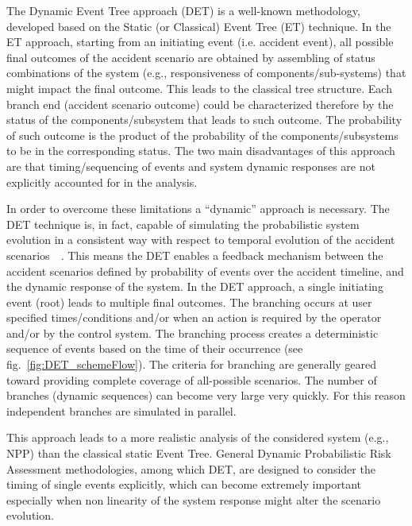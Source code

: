 \label{sec:det}
The Dynamic Event Tree approach (DET) is a well-known methodology, developed based on the Static (or Classical) Event Tree (ET) technique. In the ET approach, starting from an initiating event (i.e. accident event), all possible final outcomes of the accident scenario are obtained by assembling of status combinations of the system (e.g., responsiveness of components/sub-systems) that might impact the final outcome. This leads to the classical tree structure. Each branch end (accident scenario outcome) could be characterized therefore by the status of the components/subsystem that leads to such outcome. The probability of such outcome is the product of the probability of the components/subsystems to be in the corresponding status. The two main disadvantages of this approach are that timing/sequencing of events and system dynamic responses are not explicitly accounted for in the analysis.

In order to overcome these limitations a “dynamic” approach is necessary. The DET technique is, in fact, capable of simulating the probabilistic system evolution in a consistent way with respect to temporal evolution of the accident scenarios~\cite{alfonsiPSA}~\cite{ADAPTHakobyan}. This means the DET enables a feedback mechanism between the accident scenarios defined by probability of events over the accident timeline, and the dynamic response of the system. In the DET approach, a single initiating event (root) leads to multiple final outcomes. The branching occurs at user specified times/conditions and/or when an action is required by the operator and/or by the control system. The branching process creates a deterministic sequence of events based on the time of their occurrence (see fig.~\ref{fig:DET_schemeFlow}). The criteria for branching are generally geared toward providing complete coverage of all-possible scenarios. The number of branches (dynamic sequences) can become very large very quickly. For this reason independent branches are simulated in parallel.

This approach leads to a more realistic analysis of the considered system (e.g., NPP) than the classical static Event Tree. General Dynamic Probabilistic Risk Assessment methodologies, among which DET, are designed to consider the timing of single events explicitly, which can become extremely important especially when non linearity of the system response might alter the scenario evolution. 

